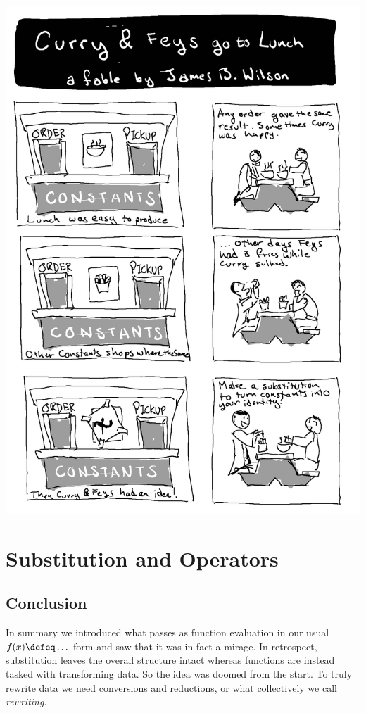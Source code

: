 
\cleardoublepage

\includegraphics[width=\textwidth]{curry-feys.png}

\chapter{Substitution and Operators}





% 

\section*{Conclusion}
In summary we introduced what passes as function evaluation 
in our usual $f(x)\defeq \ldots$ form and saw that it was in fact 
a mirage.  In retrospect, substitution leaves the overall structure 
intact whereas functions are instead tasked with transforming data.
So the idea was doomed from the start.  To truly rewrite data we need 
conversions and reductions, or what collectively we call \emph{rewriting}.

